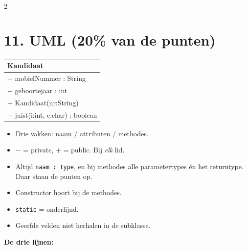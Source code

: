 \documentclass[12pt,a4paper]{extarticle}
\begin{document}
\begin{multicols}{2}
    \section{11. UML (20\% van de punten)}
    \begin{center}
        \small
        \begin{tabular}{|l|}
            \hline
            \textbf{Kandidaat}                 \\ \hline
            $-$ mobielNummer : String          \\
            $-$ geboortejaar : int             \\ \hline
            $+$ Kandidaat(nr:String)           \\
            $+$ juist(i:int, c:char) : boolean \\ \hline
        \end{tabular}
    \end{center}
    \begin{itemize}
        \item Drie vakken: naam / attributen / methodes.
        \item $-$ = private, $+$ = public. Bij \emph{elk} lid.
        \item Altijd \texttt{naam : type}, en bij methodes alle parametertypes \'en het
              returntype. Daar staan de punten op.
        \item Constructor hoort bij de methodes.
        \item \texttt{static} = onderlijnd.
        \item Geerfde velden niet herhalen in de subklasse.
    \end{itemize}

    \textbf{De drie lijnen:}

    \begin{center}
\end{center}
\end{multicols}
\end{document}
